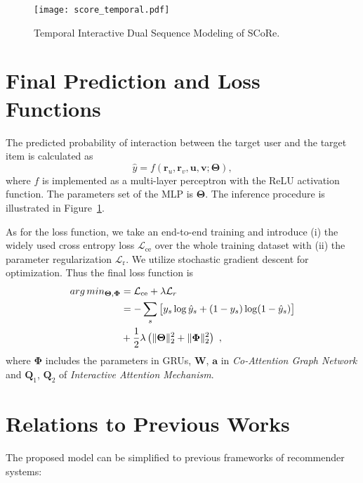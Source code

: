 \begin{figure}[t]
	\centering
	\texttt{[image: score\_temporal.pdf]}
	\caption{Temporal Interactive Dual Sequence Modeling of SCoRe.}
	\label{fig:temporal-framework}
	\vspace{-10pt}
\end{figure}


\section{Final Prediction and Loss Functions}
The predicted probability of interaction between the target user and the target item is calculated as
\begin{equation}
\hat{y} = f(\bm{r}_u, \bm{r}_v, \bm{u}, \bm{v}; \bm{\Theta}),
\end{equation}
where $f$ is implemented as a multi-layer perceptron with the ReLU activation function. The parameters set of the MLP is $\bm{\Theta}$.
The inference procedure is illustrated in Figure~\ref{fig:temporal-framework}.

As for the loss function, we take an end-to-end training and introduce (i) the widely used cross entropy loss $\mathcal{L}_{\text{ce}}$ \cite{ren2018bid,zhou2018deepa,zhou2018deepb} over the whole training dataset with (ii) the parameter regularization $\mathcal{L}_{\text{r}}$. We utilize stochastic gradient descent for optimization. Thus the final loss function is
\begin{equation}
\begin{aligned}
arg\,min_{\bm{\Theta}, \bm{\Phi}} &= \mathcal{L}_{\text{ce}} + \lambda \mathcal{L}_r \\
&= -\sum_{s} \big[ y_s \log \hat{y}_s + (1-y_s) \log (1-\hat{y}_s)\big] \\
& + \frac{1}{2} \lambda \left( \|\bm{\Theta} \|_2^2 + \| \bm{\Phi} \|_2^2 \right) ~,
\end{aligned}
\end{equation}
where $\bm{\Phi}$ includes the parameters in GRUs, $\bm{W}$, $\bm{a}$ in \textit{Co-Attention Graph Network} and $\bm Q_1$, $\bm Q_2$ of \textit{Interactive Attention Mechanism}.

\section{Relations to Previous Works}
The proposed model can be simplified to previous frameworks of recommender systems:

